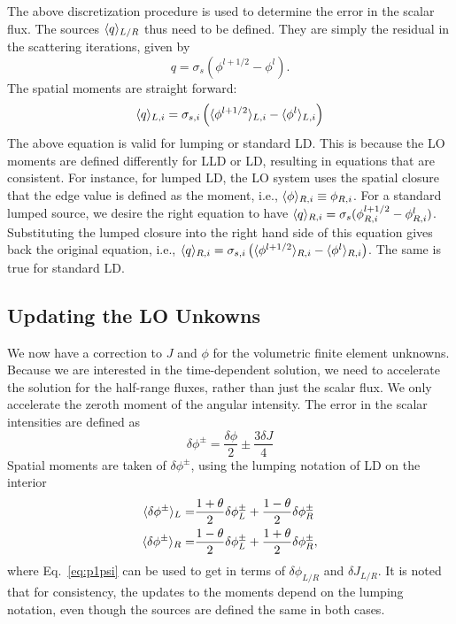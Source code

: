 The above discretization procedure is used to determine the error in the scalar flux.
The sources $\langle q \rangle_{L/R}$ thus need to be defined.  They are simply the residual in
the scattering iterations, given by
\begin{equation}
    q = \sigma_s\left(\phi^{l+1/2} - \phi^{l}\right).
\end{equation}
The spatial moments are straight forward:
\begin{equation}
    \langle q \rangle_{L,i} = \sigma_{s,i}\left(\langle \phi^{l+1/2} \rangle_{L,i} -
    \langle \phi^{l} \rangle_{L,i}\right)
\end{equation}
The above equation is valid for lumping or standard LD.  This is because the LO
moments are defined differently for LLD or LD, resulting in equations that are
consistent.  For instance, for lumped LD, the LO system uses the spatial closure that
the edge value is defined as the moment, i.e., $\langle \phi \rangle_{R,i} \equiv \phi_{R,i}$.
For a standard lumped source, we desire the right equation to have $\langle q \rangle_{R,i} =
\sigma_s(\phi^{l+1/2}_{R,i} - \phi^{l}_{R,i})$.  Substituting the lumped closure into
the right hand side of this equation gives back the original equation, i.e., $\langle q \rangle_{R,i} = \sigma_{s,i}\left(\langle \phi^{l+1/2} \rangle_{R,i} -
    \langle \phi^{l} \rangle_{R,i}\right) $.  The same is true for standard LD.

\subsection{Updating the LO Unkowns}

We now have a correction to $J$ and $\phi$ for the volumetric finite element
unknowns.
Because we are interested in the time-dependent solution, we need to accelerate the solution for the
half-range fluxes, rather than just the scalar flux. We only accelerate the zeroth
moment of the angular intensity.  The error in the scalar intensities are defined as
\begin{equation}\label{eq:p1psi}
    \delta \phi^{\pm} = \frac{\delta \phi}{2} \pm \frac{3 \delta J}{4}
\end{equation}
Spatial moments are taken of $\delta \phi^{\pm}$, using the lumping notation of LD on the interior
\begin{align}
    \langle \delta \phi^{\pm} \rangle_L =&  \frac{1+\theta}{2}\delta \phi^{\pm}_{L} +
    \frac{1-\theta}{2}\delta \phi^{\pm}_{R}  \\
    \langle \delta \phi^{\pm} \rangle_R =&  \frac{1-\theta}{2}\delta \phi^{\pm}_{L} +
    \frac{1+\theta}{2}\delta \phi^{\pm}_{R}      ,
\end{align}
where Eq.~\eqref{eq:p1psi} can be used to get in terms of $\delta \phi_{L/R}$ and $\delta J_{L/R}$.
It is noted that for consistency, the updates to the moments depend on the lumping
notation, even though the sources are defined the same in both cases.


